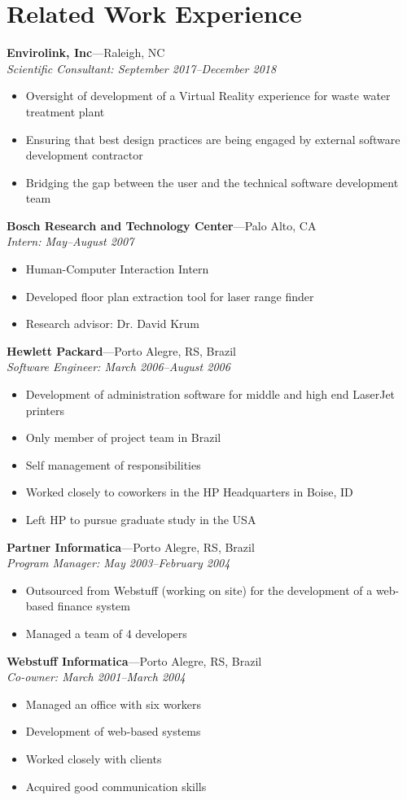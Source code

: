 \documentclass[wideaddress]{vitae}
\newcommand{\ressubitem}[1]{
	\item \begin{flushleft} #1 \end{flushleft}
}
\newcommand{\resbigitem}[3]{
	\item
	\textbf{#1}---#2 \\
	\textit{#3}
}
\newenvironment{ressubsec}[3]{
	\resbigitem{#1}{#2}{#3}
	\begin{itemize}
}{
	\end{itemize}
}
\begin{document}
\section{Related Work Experience}
\begin{description}
	\begin{ressubsec}{Envirolink, Inc}{Raleigh, NC}{Scientific Consultant: September 2017--December 2018}
		\ressubitem{Oversight of development of a Virtual Reality experience for waste water treatment plant}
		\ressubitem{Ensuring that best design practices are being engaged by external software development contractor}
		\ressubitem{Bridging the gap between the user and the technical software development team}
	\end{ressubsec}

	\begin{ressubsec}{Bosch Research and Technology Center}{Palo Alto, CA}{Intern: May--August 2007}
		\ressubitem{Human-Computer Interaction Intern}
		\ressubitem{Developed floor plan extraction tool for laser range finder}
		\ressubitem{Research advisor: Dr. David Krum}
	\end{ressubsec}

	\begin{ressubsec}{Hewlett Packard}{Porto Alegre, RS, Brazil}{Software Engineer: March 2006--August 2006}
		\ressubitem{Development of administration software for middle and high end LaserJet printers}
		\ressubitem{Only member of project team in Brazil}
		\ressubitem{Self management of responsibilities}
		\ressubitem{Worked closely to coworkers in the HP Headquarters in Boise, ID}
		\ressubitem{Left HP to pursue graduate study in the USA}
	\end{ressubsec}

	\begin{ressubsec}{Partner Informatica}{Porto Alegre, RS, Brazil}{Program Manager: May 2003--February 2004}
		\ressubitem{Outsourced from Webstuff (working on site) for the development of a web-based finance system}
		\ressubitem{Managed a team of 4 developers}
	\end{ressubsec}

	\begin{ressubsec}{Webstuff Informatica}{Porto Alegre, RS, Brazil}{Co-owner: March 2001--March 2004}
		\ressubitem{Managed an office with six workers}
		\ressubitem{Development of web-based systems}
		\ressubitem{Worked closely with clients}
		\ressubitem{Acquired good communication skills}
	\end{ressubsec}
\end{description}
\end{document}

